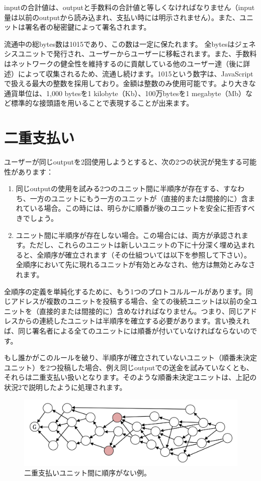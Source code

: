 \documentclass[a4paper, dvipdfmx]{jsarticle}
\begin{document}
\noindent inputの合計値は、outputと手数料の合計値と等しくなければなりません（input量は以前のoutputから読み込まれ、支払い時には明示されません）。また、ユニットは署名者の秘密鍵によって署名されます。

流通中の総bytes数は1015であり、この数は一定に保たれます。 全bytesはジェネシスユニットで発行され、ユーザーからユーザーに移転されます。また、手数料はネットワークの健全性を維持するのに貢献している他のユーザー達（後に詳述）によって収集されるため、流通し続けます。1015という数字は、JavaScriptで扱える最大の整数を採用しており。金額は整数のみ使用可能です。より大きな通貨単位は、1,000 bytesを1 kilobyte（Kb）、100万bytesを1 megabyte（Mb）など標準的な接頭語を用いることで表現することが出来ます。

\section{二重支払い}
ユーザーが同じoutputを2回使用しようとすると、次の2つの状況が発生する可能性があります：

\begin{enumerate}
    \item 同じoutputの使用を試みる2つのユニット間に半順序が存在する、すなわち、一方のユニットにもう一方のユニットが（直接的または間接的に）含まれている場合。この時には、明らかに順番が後のユニットを安全に拒否すべきでしょう。
    \item ユニット間に半順序が存在しない場合。この場合には、両方が承認されます。ただし、これらのユニットは新しいユニットの下に十分深く埋め込まれると、全順序が確立されます（その仕組ついては以下を参照して下さい）。全順序において先に現れるユニットが有効とみなされ、他方は無効とみなされます。
\end{enumerate}

全順序の定義を単純化するために、もう1つのプロトコルルールがあります。同じアドレスが複数のユニットを投稿する場合、全ての後続ユニットは以前の全ユニットを（直接的または間接的に）含めなければなりません。つまり、同じアドレスからの連続したユニットは半順序を確立する必要があります。言い換えれば、同じ署名者による全てのユニットには順番が付いていなければならないのです。

もし誰かがこのルールを破り、半順序が確立されていないユニット（順番未決定ユニット）を2つ投稿した場合、例え同じoutputでの送金を試みていなくとも、それらは二重支払い扱いとなります。そのような順番未決定ユニットは、上記の状況2で説明したように処理されます。

\begin{figure}[htbp]
  \includegraphics[width=\linewidth]{fig2.png}
  \caption{二重支払いユニット間に順序がない例。}
\end{figure}
\end{document}
